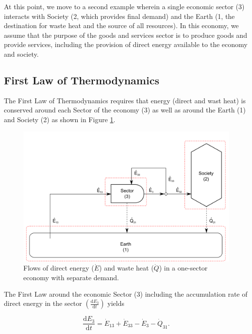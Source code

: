 \documentclass[authoryear,preprint,review,12pt]{elsarticle}
\begin{document}
At this point, we move to a second example wherein a single economic sector (3) interacts with Society (2, which provides final demand) and the Earth (1, the destination for waste heat and the source of all resources). In this economy, we assume that the purpose of the goods and services sector is to produce goods and provide services, including the provision of direct energy available to the economy and society.

\subsection{First Law of Thermodynamics}

The First Law of Thermodynamics requires that energy (direct and wast heat) is conserved around each Sector of the economy (3) as well as around the Earth (1) and Society (2) as shown in Figure \ref{fig:direct_energy_flows}. 

\begin{figure}[h!]
\includegraphics[width=1.0\linewidth]{images/I-O_two_sector_direct_energy.pdf}
\caption{Flows of direct energy ($\dot{E}$) and waste heat ($\dot{Q}$) in a one-sector economy with separate demand.}
\label{fig:direct_energy_flows}
\end{figure}

The First Law around the economic Sector (3) including the accumulation rate of direct energy in the sector $\left(\frac{\mathrm{d}E_{3}}{\mathrm{d}t}\right)$ yields

\begin{equation} \label{eq:CV_E_dot_3}
	\frac{\mathrm{d}E_{3}}{\mathrm{d}t} 	 = \dot{E}_{13} + \dot{E}_{33} - \dot{E}_{3} - \dot{Q}_{31}.
\end{equation}
\end{document}
